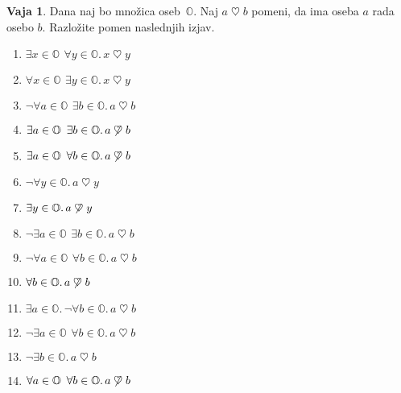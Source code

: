 \documentclass{article}
\theoremstyle{definition}
\newtheorem{vaja}{Vaja}[section]
\begin{document}
\newcommand{\rad}{\mathrel{\heartsuit}}
\begin{vaja}
Dana naj bo množica oseb~$\mathbb{O}$. Naj $a \rad b$ pomeni, da ima oseba $a$ rada osebo $b$.
Razložite pomen naslednjih izjav.
\begin{enumerate}
\item $\exists x \in \mathbb{O}\,\ \forall y \in \mathbb{O}. \, x \rad y$
\item $\forall x \in \mathbb{O}\,\ \exists y \in \mathbb{O}. \, x \rad y$
\item $\lnot \forall a \in \mathbb{O}\,\ \exists b \in \mathbb{O}.  \, a \rad b$
\item $\exists a \in \mathbb{O}\,\ \exists b \in \mathbb{O}. \, a \not\rad b$
\item $\exists a \in \mathbb{O}\,\ \forall b \in \mathbb{O}. \, a \not\rad b$
\item $\lnot \forall y \in \mathbb{O}. \, a \rad y$
\item $\exists y \in \mathbb{O}. \, a \not\rad y$
\item $\lnot \exists a \in \mathbb{O}\,\ \exists b \in \mathbb{O}. \, a \rad b$
\item $\lnot \forall a \in \mathbb{O}\,\ \forall b \in \mathbb{O}. \, a \rad b$
\item $\forall b \in \mathbb{O}. \, a \not\rad b$
\item $\exists a \in \mathbb{O}. \, \lnot \forall b \in \mathbb{O}. \,  a \rad b$
\item $\lnot \exists a \in \mathbb{O}\,\ \forall b \in \mathbb{O}. \, a \rad b$
\item $\lnot \exists b \in \mathbb{O}. \, a \rad b$
\item $\forall a \in \mathbb{O}\,\ \forall b \in \mathbb{O}. \,  a \not\rad b$
\end{enumerate}
\end{vaja}
\end{document}
